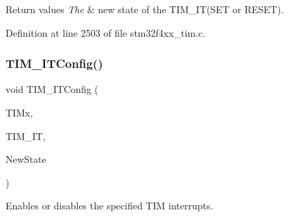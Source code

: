 \begin{DoxyRetVals}{Return values}
{\em The} & new state of the T\+I\+M\+\_\+\+I\+T(\+S\+E\+T or R\+E\+S\+E\+T). \\
\hline
\end{DoxyRetVals}


Definition at line 2503 of file stm32f4xx\+\_\+tim.\+c.

\mbox{\label{group___t_i_m___group5_ga70e3d6c09d55ee69002e154c85cd40e4}} 
\subsubsection{\texorpdfstring{T\+I\+M\+\_\+\+I\+T\+Config()}{TIM\_ITConfig()}}
{\footnotesize\ttfamily void T\+I\+M\+\_\+\+I\+T\+Config (\begin{DoxyParamCaption}\item[{\hyperlink{struct_t_i_m___type_def}{T\+I\+M\+\_\+\+Type\+Def} $\ast$}]{T\+I\+Mx,  }\item[{uint16\+\_\+t}]{T\+I\+M\+\_\+\+IT,  }\item[{Functional\+State}]{New\+State }\end{DoxyParamCaption})}



Enables or disables the specified T\+IM interrupts. 


